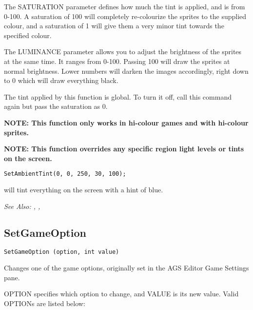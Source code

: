 The SATURATION parameter defines how much the tint is applied, and is from 0-100. A
saturation of 100 will completely re-colourize the sprites to the supplied colour, and a
saturation of 1 will give them a very minor tint towards the specified colour.

The LUMINANCE parameter allows you to adjust the brightness of the sprites at the same time.
It ranges from 0-100. Passing 100 will draw the sprites at normal brightness. Lower
numbers will darken the images accordingly, right down to 0 which will draw everything black.

The tint applied by this function is global. To turn it off, call this command again but
pass the saturation as 0.

\bf{NOTE:} This function only works in hi-colour games and with hi-colour sprites.

\bf{NOTE:} This function overrides any specific region light levels or tints on the screen.

\begin{verbatim}
SetAmbientTint(0, 0, 250, 30, 100);
\end{verbatim}
will tint everything on the screen with a hint of blue.

\it{See Also:} ,
, 



\subsection{SetGameOption}\label{SetGameOption}%

\begin{verbatim}
SetGameOption (option, int value)
\end{verbatim}

Changes one of the game options, originally set in the AGS Editor Game Settings pane.

OPTION specifies which option to change, and VALUE is its new value. Valid OPTIONs are
listed below:

